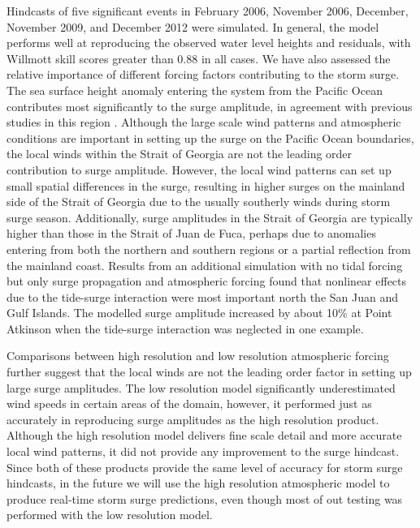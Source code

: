 \documentclass[pdftex,10pt]{article}
\begin{document}
Hindcasts of five significant events in February 2006, November 2006, December, November 2009, and December 2012 were simulated. In general, the model performs well at reproducing the observed water level heights and residuals, with Willmott skill scores greater than 0.88 in all cases. We have also assessed the relative importance of different forcing factors contributing to the storm surge. The sea surface height anomaly entering the system from the Pacific Ocean contributes most significantly to the surge amplitude, in agreement with previous studies in this region \citep{murty1995storm}. Although the large scale wind patterns and atmospheric conditions are important in setting up the surge on the Pacific Ocean boundaries, the local winds within the Strait of Georgia are not the leading order contribution to surge amplitude. However, the local wind patterns can set up small spatial differences in the surge, resulting in higher surges on the mainland side of the Strait of Georgia due to the usually southerly winds during storm surge season. Additionally, surge amplitudes in the Strait of Georgia are typically higher than those in the Strait of Juan de Fuca, perhaps due to anomalies entering from both the northern and southern regions or a partial reflection from the mainland coast. Results from an additional simulation with no tidal forcing but only surge propagation and atmospheric forcing found that nonlinear effects due to the tide-surge interaction were most important north the San Juan and Gulf Islands. The modelled surge amplitude increased by about 10\% at Point Atkinson when the tide-surge interaction was neglected in one example. 

Comparisons between high resolution and low resolution atmospheric forcing further suggest that the local winds are not the leading order factor in setting up large surge amplitudes. The low resolution model significantly underestimated wind speeds in certain areas of the domain, however, it performed just as accurately in reproducing surge amplitudes as the high resolution product.  Although the high resolution model delivers fine scale detail and more accurate local wind patterns, it did not provide any improvement to the surge hindcast. Since both of these products provide the same level of accuracy for storm surge hindcasts, in the future we will use the high resolution atmospheric model to produce real-time storm surge predictions, even though most of out testing was performed with the low resolution model. 
\end{document}
